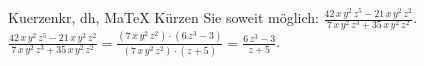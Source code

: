\begin{MAufgabe}{Kuerzen}{kr, dh, MaTeX}
K\"urzen Sie soweit m\"oglich: $\frac{42\, x\, y^2\, z^5 - 21\, x\, y^2\, z^2}{7\, x\, y^2\, z^3 + 35\, x\, y^2\, z^2}$.\\ 
\ifLsg\MLoesung
\quad $\frac{42\, x\, y^2\, z^5 - 21\, x\, y^2\, z^2}{7\, x\, y^2\, z^3 + 35\, x\, y^2\, z^2}=\frac{(7\, x\, y^2\, z^2)\cdot(6\, z^3 - 3)}{(7\, x\, y^2\, z^2)\cdot(z + 5)}=\frac{6\, z^3 - 3}{z + 5}$.\else\relax\fi
 \end{MAufgabe}
